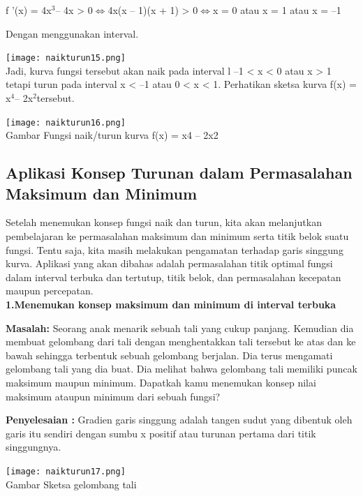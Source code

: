 \documentclass[11pt,fleqn]{book} %
\begin{document}
f '(x) = 4x$^{3} $– 4x > 0$ \Leftrightarrow $4x(x – 1)(x + 1) > 0$ \Leftrightarrow $x = 0 atau x = 1 atau x = –1

Dengan menggunakan interval.

\texttt{[image: naikturun15.png]}\\

Jadi, kurva fungsi tersebut akan naik pada interval l –1 < x < 0 atau x > 1 tetapi turun pada interval x < –1 atau 0 < x < 1. Perhatikan sketsa kurva f(x) = x$^{4} $– 2x$^{2} $tersebut.\\

\begin{center}
\texttt{[image: naikturun16.png]}\\
Gambar Fungsi naik/turun kurva f(x) = x4 – 2x2
\end{center}

\subsection{Aplikasi Konsep Turunan dalam
Permasalahan Maksimum dan Minimum}

Setelah menemukan konsep fungsi naik dan turun,
kita akan melanjutkan pembelajaran ke permasalahan
maksimum dan minimum serta titik belok suatu fungsi.
Tentu saja, kita masih melakukan pengamatan terhadap
garis singgung kurva. Aplikasi yang akan dibahas adalah permasalahan titik optimal fungsi dalam interval terbuka dan tertutup, titik belok, dan permasalahan kecepatan maupun percepatan.\\

\textbf{1.Menemukan konsep maksimum dan minimum di interval terbuka}

\textbf{Masalah: }
Seorang anak menarik sebuah tali yang cukup
panjang. Kemudian dia membuat gelombang dari
tali dengan menghentakkan tali tersebut ke atas dan
ke bawah sehingga terbentuk sebuah gelombang
berjalan. Dia terus mengamati gelombang tali yang
dia buat. Dia melihat bahwa gelombang tali memiliki
puncak maksimum maupun minimum. Dapatkah
kamu menemukan konsep nilai maksimum ataupun
minimum dari sebuah fungsi?

\textbf{Penyelesaian :}
Gradien garis singgung adalah tangen sudut yang
dibentuk oleh garis itu sendiri dengan sumbu x positif atau turunan pertama dari titik singgungnya.

\begin{center}
\texttt{[image: naikturun17.png]}\\
Gambar Sketsa gelombang tali
\end{center}
\end{document}
